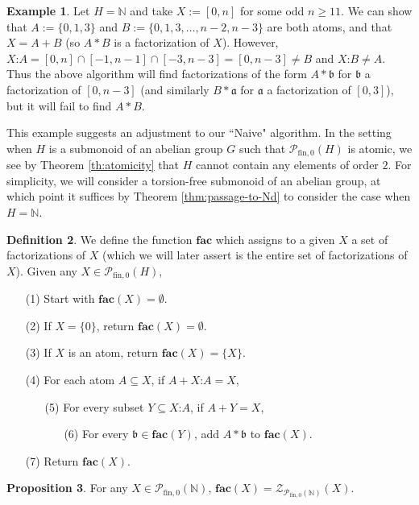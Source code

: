 \documentclass{report}
\renewcommand{\aa}{\mathfrak{a}}
\newcommand{\bb}{\mathfrak{b}}
\newcommand{\NN}{\mathbb{N}}
\renewcommand{\P}{\mathcal{P}}
\newcommand{\Z}{\mathcal{Z}}
\newcommand{\fin}{\textrm{fin}}
\newcommand{\fon}{{\textrm{fin}, 0}}
\renewcommand{\:}{\text{:}}
\newcommand{\PN}{{\P_{\fin,0}(\NN)}}
\theoremstyle{definition}
\newtheorem{defn}{Definition}[section]
\newtheorem{prop}[defn]{Proposition}
\newtheorem{eg}[defn]{Example}
\begin{document}
\begin{eg}
Let $H = \NN$ and take $X := [0,n]$ for some odd $n \ge 11$.
We can show that $A := \{0,1,3\}$ and $B := \{0,1,3,\dots,n-2,n-3\}$ are both atoms, and that $X = A + B$ (so $A*B$ is a factorization of $X$).
However, $X\:A = [0,n] \cap [-1,n-1] \cap [-3,n-3] = [0,n-3] \neq B$ and $X\: B \neq A$.
Thus the above algorithm will find factorizations of the form $A*\bb$ for $\bb$ a factorization of $[0,n-3]$ (and similarly $B*\aa$ for $\aa$ a factorization of $[0,3]$), but it will fail to find $A*B$.
\end{eg} 

This example suggests an adjustment to our ``Naive" algorithm.
In the setting when $H$ is a submonoid of an abelian group $G$ such that $\P_\fon(H)$ is atomic, we see by Theorem \ref{th:atomicity} that $H$ cannot contain any elements of order $2$.
For simplicity, we will consider a torsion-free submonoid of an abelian group, at which point it suffices by Theorem \ref{thm:passage-to-Nd} to consider the case when $H = \NN$.

\begin{defn} \label{def:fac algorithm}
We define the function $\mathbf{fac}$ which assigns to a given $X$ a set of factorizations of $X$ (which we will later assert is the entire set of factorizations of $X$).
Given any $X\in \P_\fon(H)$,
\begin{itemize}
	\item[(1)] Start with $\mathbf{fac}(X) = \emptyset$.
	\item[(2)] If $X = \{0\}$, return $\mathbf{fac}(X) = \emptyset$.
	\item[(3)] If $X$ is an atom, return $\mathbf{fac}(X) = \{X\}$. 
	\item[(4)] For each atom $A \subseteq X$, if $A + X\:A = X$,
	\begin{itemize}
	\item[(5)] For every subset $Y \subseteq X\:A$, if $A+Y = X$,
	\begin{itemize}
		\item[(6)] For every $\bb\in \mathbf{fac}(Y)$, add $A*\bb$ to $\mathbf{fac}(X)$.
	\end{itemize}
\end{itemize}
\item[(7)] Return $\mathbf{fac}(X)$.
\end{itemize}
\end{defn}

\begin{prop}
For any $X\in \PN$, $\mathbf{fac}(X) = \Z_{\PN}(X)$.
\end{prop}
\end{document}
